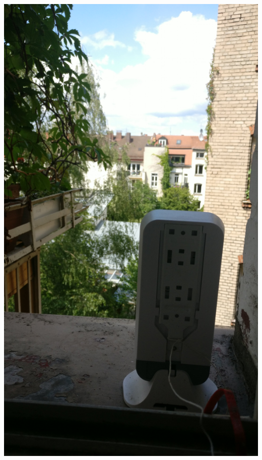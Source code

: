 \documentclass{beamer}
\begin{document}
	\begin{frame}
		\includegraphics[height=0.75\framewidth]{media/p2p-fensterbrett1.jpg}
	\end{frame}
\end{document}
